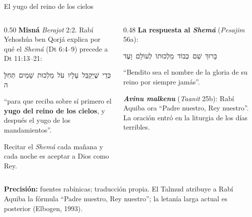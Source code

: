 \documentclass[hyperref={bookmarks=false},aspectratio=169]{beamer}
\newcommand{\heb}[1]{\mbox{\foreignlanguage{hebrew}{#1}}}
\newcommand{\destacar}[1]{\textbf{\textcolor{azul}{#1}}}
\newcommand{\precision}[1]{{\footnotesize\color{gris}\textbf{Precisión:} #1}}
\begin{document}
\begin{frame}{El yugo del reino de los cielos}
\begin{columns}[t,onlytextwidth]
\begin{column}{0.50\textwidth}\small
\textbf{Misná} \emph{Berajot} 2:2. Rabí Yehoshúa ben Qorjá explica por qué el \emph{Shemá} (Dt 6:4--9) precede a Dt 11:13--21:
\begin{center}\heb{כְּדֵי שֶׁיְּקַבֵּל עָלָיו עֹל מַלְכוּת שָׁמַיִם תְּחִלָּה}\end{center}
``para que reciba sobre sí primero el \destacar{yugo del reino de los cielos}, y después el yugo de los mandamientos''.\par\smallskip
Recitar el \emph{Shemá} cada mañana y cada noche es aceptar a Dios como Rey.
\end{column}
\begin{column}{0.48\textwidth}\small
\textbf{La respuesta al \emph{Shemá}} (\emph{Pesajim} 56a):
\begin{center}\heb{בָּרוּךְ שֵׁם כְּבוֹד מַלְכוּתוֹ לְעוֹלָם וָעֶד}\end{center}
``Bendito sea el nombre de la gloria de su reino por siempre jamás''.\par\smallskip
\textbf{\emph{Avinu malkenu}} (\emph{Taanit} 25b): Rabí Aquiba ora ``Padre nuestro, Rey nuestro''. La oración entró en la liturgia de los días terribles.
\end{column}
\end{columns}\par\smallskip
\precision{fuentes rabínicas; traducción propia. El Talmud atribuye a Rabí Aquiba la fórmula ``Padre nuestro, Rey nuestro''; la letanía larga actual es posterior (Elbogen, 1993).}
\end{frame}
\end{document}
